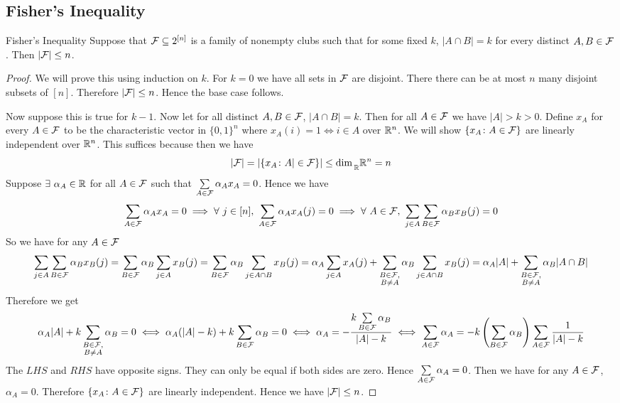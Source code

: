 \documentclass[twoside]{article}
\begin{document}
\subsection{Fisher's Inequality}
\begin{Theorem}{Fisher's Inequality}{}
	Suppose that $\mathcal{F}\subseteq 2^{[n]}$ is a family of nonempty clubs such that for some fixed $k$, $|A\cap B|=k$ for every distinct $A,B\in \mathcal{F}$. Then $|\mathcal{F}|\leq n$.
\end{Theorem}
\begin{proof}
	We will prove this using induction on $k$. For $k=0$ we have all sets in $\mathcal{F}$ are disjoint. There there can be at most $n$ many disjoint subsets of $[n]$. Therefore $|\mathcal{F}|\leq n$. Hence the base case follows.
	
	Now suppose this is true for $k-1$. Now let for all distinct $A,B\in\mathcal{F}$, $|A\cap B|=k$. Then for all $A\in\mathcal{F}$ we have $|A|>k>0$. Define $x_A$ for every $A\in \mathcal{F}$ to be the characteristic vector in $\{0,1\}^n$ where $x_A(i)=1\iff i\in A$ over $\mathbb{R}^n$. We will show $\{x_A\colon A\in\mathcal{F}\}$ are linearly independent over $\mathbb{R}^n$. This suffices because then we have $$|\mathcal{F}|= |\{x_A\colon A|\in\mathcal{F}\}|\leq \dim\strut_{\mathbb{R}}\mathbb{R}^n=n$$Suppose $\exists\ \alpha_A\in\mathbb{R}$ for all $A\in \mathcal{F}$ such that $\sum\limits_{A\in \mathcal{F}}\alpha_Ax_A=0$. Hence we have$$
	\sum_{A\in \mcF}\alpha_Ax_A=0  \implies \forall\ j\in[n],\ \sum_{A\in \mcF}\alpha_Ax_{A}(j)=0          \implies \forall \ A\in\mcF,\ \sum_{j\in A}\sum_{B\in\mcF}\alpha_Bx_B(j)=0 $$So we have for any $A\in\mathcal{F}$ $$
	\sum_{j\in A}\sum_{B\in\mathcal{F}}\alpha_Bx_B(j)=\sum_{B\in\mathcal{F}}\alpha_B\sum_{j\in A}x_B(j)=\sum_{B\in\mathcal{F}}\alpha_B\sum_{j\in A\cap B}x_B(j)=\alpha_A\sum_{j\in A}x_A(j)+\sum_{\substack{B\in\mathcal{F},\\ B\neq A}}\alpha_B\sum_{j\in A\cap B}x_B(j) =\alpha_A|A|+ \sum_{\substack{B\in\mathcal{F},\\ B\neq A}}\alpha_B|A\cap B|$$Therefore we get $$\alpha_A|A|+ k\sum_{\substack{B\in\mathcal{F},\\ B\neq A}}\alpha_B=0\iff \alpha_A(|A|-k)+ k\sum_{B\in\mathcal{F}}\alpha_B=0\iff \alpha_A=-\frac{k\sum\limits_{B\in\mathcal{F}}\alpha_B}{|A|-k}\iff \sum_{A\in\mathcal{F}}\alpha_A=-k\left(\sum_{B\in\mathcal{F}}\alpha_B\right)\sum_{A\in\mathcal{F}}\frac1{|A|-k}$$The $LHS $ and $RHS$ have opposite signs. They can only be equal if both sides are zero. Hence $\sum\limits_{A\in\mathcal{F}}\alpha_A=0$. Then we have for any $A\in\mathcal{F}$, $\alpha_A=0$. Therefore $\{x_A\colon A\in\mathcal{F}\}$ are linearly independent. Hence we have $|\mathcal{F}|\leq n$. 
\end{proof}
\end{document}

